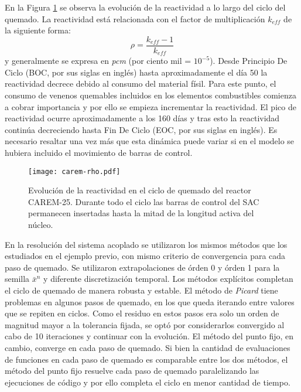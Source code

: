 En la Figura \ref{carem-rho} se observa la evolución de la reactividad a lo largo del ciclo del quemado.
La reactividad está relacionada con el factor de multiplicación $k_{eff}$ de la siguiente forma:
\begin{equation}
\rho = \frac{k_{eff}-1}{k_{eff}}
\end{equation}
y generalmente se expresa en \textit{pcm} (por ciento mil = $10^{-5}$).
Desde Principio De Ciclo (BOC, por sus siglas en inglés) hasta aproximadamente el día 50 la reactividad decrece debido al consumo del material físil.
Para este punto, el consumo de venenos quemables incluidos en los elementos combustibles comienza a cobrar importancia y por ello se empieza incrementar la reactividad.
El pico de reactividad ocurre aproximadamente a los 160 días y tras esto la reactividad continúa decreciendo hasta Fin De Ciclo (EOC, por sus siglas en inglés).
Es necesario resaltar una vez más que esta dinámica puede variar si en el modelo se hubiera incluido el movimiento de barras de control.

\begin{figure}[ht]
	\centering
  \texttt{[image: carem-rho.pdf]}
\caption[Evolución de la reactividad en el ciclo de quemado del reactor CAREM-25]
{Evolución de la reactividad en el ciclo de quemado del reactor CAREM-25.
Durante todo el ciclo las barras de control del SAC permanecen insertadas hasta la mitad de la longitud activa del núcleo.}
\label{carem-rho}
\end{figure}

En la resolución del sistema acoplado se utilizaron los mismos métodos que los estudiados en el ejemplo previo,
con mismo criterio de convergencia para cada paso de quemado.
Se utilizaron extrapolaciones de órden 0 y órden 1 para la semilla $\bar{x}^n$ y diferente discretización temporal.
Los métodos explícitos completan el ciclo de quemado de manera robusta y estable.
El método de \textit{Picard} tiene problemas en algunos pasos de quemado,
en los que queda iterando entre valores que se repiten en ciclos.
Como el residuo en estos pasos era solo un orden de magnitud mayor a la tolerancia fijada,
se optó por considerarlos convergido al cabo de 10 iteraciones y continuar con la evolución.
El método del punto fijo, en cambio, converge en cada paso de quemado.
Si bien la cantidad de evaluaciones de funciones  en cada paso de quemado es comparable entre los dos métodos,
el método del punto fijo resuelve cada paso de quemado paralelizando las ejecuciones de código y por ello completa el ciclo en menor cantidad de tiempo.

